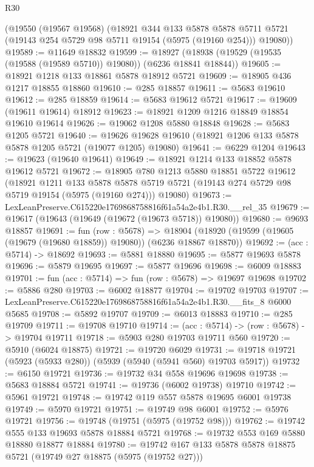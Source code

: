 \begin{lexlean}{R30}
\begin{coremodule}
    (@19550
      (@19567 @19568)
      (@18921
        @344
        @133
        @5878
        @5878
        @5711
        @5721
        (@19143 @254 @5729 @98 @5711 @19154 (@5975 (@19160 @254)))
        @19080))
@19589 := @11649 @18832
@19599 := @18927 (@18938 (@19529 (@19535 (@19588 (@19589 @5710)) @19080)) (@6236 @18841 @18844))
@19605 := @18921 @1218 @133 @18861 @5878 @18912 @5721
@19609 := @18905 @436 @1217 @18855 @18860
@19610 := @285 @18857
@19611 := @5683 @19610
@19612 := @285 @18859
@19614 := @5683 @19612 @5721
@19617 := @19609 (@19611 @19614) @18912
@19623 := @18921 @1209 @1216 @18849 @18854 @19610 @19614
@19626 := @19062 @1208 @5880 @18848
@19628 := @5683 @1205 @5721
@19640 := @19626 @19628 @19610 (@18921 @1206 @133 @5878 @5878 @1205 @5721 (@19077 @1205) @19080)
@19641 := @6229 @1204
@19643 := @19623 (@19640 @19641)
@19649 := @18921 @1214 @133 @18852 @5878 @19612 @5721
@19672 := @18905
    @780
    @1213
    @5880
    @18851
    @5722
    @19612
    (@18921
      @1211
      @133
      @5878
      @5878
      @5719
      @5721
      (@19143 @274 @5729 @98 @5719 @19154 (@5975 (@19160 @274)))
      @19080)
@19673 := LexLeanPreserve.C615220e1769868758816f61a54a2e4b1.R30.__rel_35
@19679 := @19617 (@19643 (@19649 (@19672 (@19673 @5718)) @19080))
@19680 := @9693 @18857
@19691 := fun (row : @5678) =>
  @18904 (@18920 (@19599 (@19605 (@19679 (@19680 @18859)) @19080)) (@6236 @18867 @18870))
@19692 := (acc : @5714) -> @18692
@19693 := @5881 @18880
@19695 := @5877 @19693 @5878
@19696 := @5879 @19695
@19697 := @5877 @19696
@19698 := @6009 @18883
@19701 := fun (acc : @5714) => fun (row : @5678) => @19697 @19698
@19702 := @5886 @280
@19703 := @6002 @18877
@19704 := @19702 @19703
@19707 := LexLeanPreserve.C615220e1769868758816f61a54a2e4b1.R30.__fits_8 @6000 @5685
@19708 := @5892 @19707
@19709 := @6013 @18883
@19710 := @285 @19709
@19711 := @19708 @19710
@19714 := (acc : @5714) -> (row : @5678) -> @19704 @19711
@19718 := @5903 @280 @19703 @19711 @560
@19720 := @5910 (@6024 @18875)
@19721 := @19720 @6029
@19731 := @19718 @19721 (@5923 (@5933 @280)) (@5939 (@5940 (@5941 @560) @19703 @5917))
@19732 := @6150 @19721
@19736 := @19732 @34 @558 @19696 @19698
@19738 := @5683 @18884 @5721
@19741 := @19736 (@6002 @19738) @19710
@19742 := @5961 @19721
@19748 := @19742 @119 @557 @5878 @19695 @6001 @19738
@19749 := @5970 @19721
@19751 := @19749 @98 @6001
@19752 := @5976 @19721
@19756 := @19748 (@19751 (@5975 (@19752 @98)))
@19762 := @19742 @555 @133 @19693 @5878 @18884 @5721
@19768 := @19732 @553 @169 @5880 @18880 @18877 @18884
@19780 := @19742 @167 @133 @5878 @5878 @18875 @5721 (@19749 @27 @18875 (@5975 (@19752 @27)))

\end{coremodule}
\end{lexlean}
